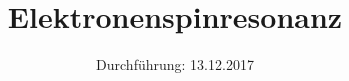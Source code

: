 

\subject{V28}
\title{Elektronenspinresonanz}
\date{
  Durchführung: 13.12.2017
  \hspace{3em}
}



\maketitle
\thispagestyle{empty}
\tableofcontents
\newpage







\nocite{*}
\printbibliography








